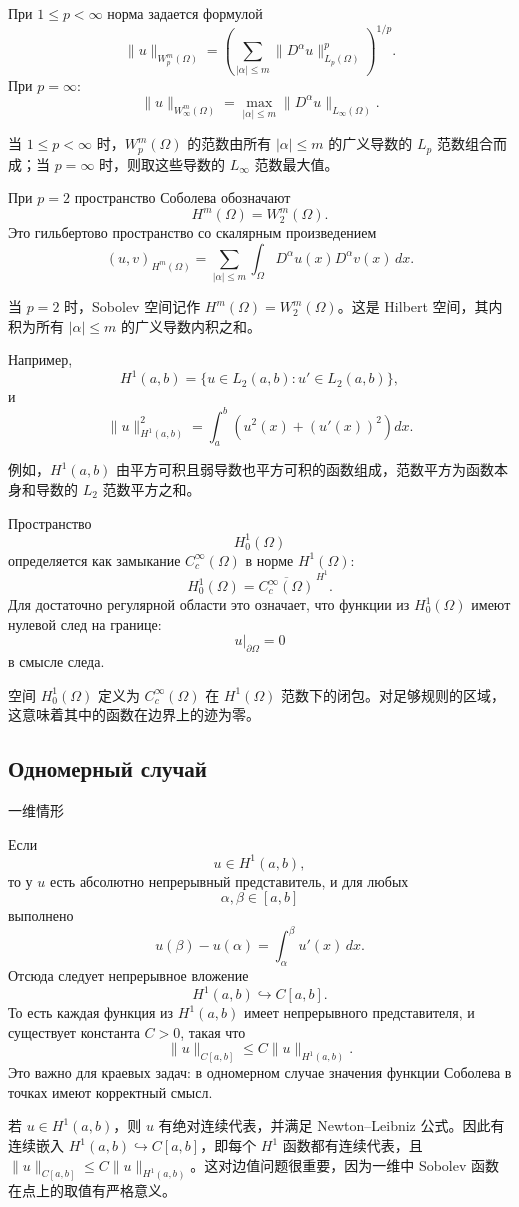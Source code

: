 \documentclass[12pt,a4paper]{article}
\newcommand{\zh}[1]{\par\noindent #1\par}
\begin{document}

При \(1\le p<\infty\) норма задается формулой
\[
\|u\|_{W_p^m(\Omega)}=
\left(
\sum_{|\alpha|\le m}
\|D^\alpha u\|_{L_p(\Omega)}^p
\right)^{1/p}.
\]
При \(p=\infty\):
\[
\|u\|_{W_\infty^m(\Omega)}=
\max_{|\alpha|\le m}
\|D^\alpha u\|_{L_\infty(\Omega)}.
\]
\zh{当 \(1\le p<\infty\) 时，\(W_p^m(\Omega)\) 的范数由所有 \(|\alpha|\le m\) 的广义导数的 \(L_p\) 范数组合而成；当 \(p=\infty\) 时，则取这些导数的 \(L_\infty\) 范数最大值。}

При \(p=2\) пространство Соболева обозначают
\[
H^m(\Omega)=W_2^m(\Omega).
\]
Это гильбертово пространство со скалярным произведением
\[
(u,v)_{H^m(\Omega)}=
\sum_{|\alpha|\le m}
\int_\Omega D^\alpha u(x)D^\alpha v(x)\,dx.
\]
\zh{当 \(p=2\) 时，Sobolev 空间记作 \(H^m(\Omega)=W_2^m(\Omega)\)。这是 Hilbert 空间，其内积为所有 \(|\alpha|\le m\) 的广义导数内积之和。}

Например,
\[
H^1(a,b)=\{u\in L_2(a,b):u'\in L_2(a,b)\},
\]
и
\[
\|u\|_{H^1(a,b)}^2=
\int_a^b\left(u^2(x)+(u'(x))^2\right)dx.
\]
\zh{例如，\(H^1(a,b)\) 由平方可积且弱导数也平方可积的函数组成，范数平方为函数本身和导数的 \(L_2\) 范数平方之和。}

Пространство
\[
H_0^1(\Omega)
\]
определяется как замыкание \(C_c^\infty(\Omega)\) в норме \(H^1(\Omega)\):
\[
H_0^1(\Omega)=\overline{C_c^\infty(\Omega)}^{\,H^1}.
\]
Для достаточно регулярной области это означает, что функции из \(H_0^1(\Omega)\) имеют нулевой след на границе:
\[
u|_{\partial\Omega}=0
\]
в смысле следа.
\zh{空间 \(H_0^1(\Omega)\) 定义为 \(C_c^\infty(\Omega)\) 在 \(H^1(\Omega)\) 范数下的闭包。对足够规则的区域，这意味着其中的函数在边界上的迹为零。}

\subsection*{Одномерный случай}
\zh{一维情形}
Если
\[
u\in H^1(a,b),
\]
то у \(u\) есть абсолютно непрерывный представитель, и для любых
\[
\alpha,\beta\in[a,b]
\]
выполнено
\[
u(\beta)-u(\alpha)=\int_\alpha^\beta u'(x)\,dx.
\]
Отсюда следует непрерывное вложение
\[
H^1(a,b)\hookrightarrow C[a,b].
\]
То есть каждая функция из \(H^1(a,b)\) имеет непрерывного представителя, и существует константа \(C>0\), такая что
\[
\|u\|_{C[a,b]}\le C\|u\|_{H^1(a,b)}.
\]
Это важно для краевых задач: в одномерном случае значения функции Соболева в точках имеют корректный смысл.
\zh{若 \(u\in H^1(a,b)\)，则 \(u\) 有绝对连续代表，并满足 Newton--Leibniz 公式。因此有连续嵌入 \(H^1(a,b)\hookrightarrow C[a,b]\)，即每个 \(H^1\) 函数都有连续代表，且 \(\|u\|_{C[a,b]}\le C\|u\|_{H^1(a,b)}\)。这对边值问题很重要，因为一维中 Sobolev 函数在点上的取值有严格意义。}
\end{document}
